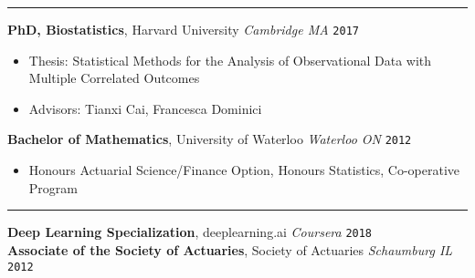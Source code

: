 \documentclass[10pt,english]{report}
\begin{document}
\vspace{5mm}

{\par}
\vspace{1mm}\hrule
\vspace{1mm}

\textbf{PhD, Biostatistics}, Harvard University \hfill \textit{Cambridge MA} \texttt{\quad \phantom{00/0000-00/}2017}
\begin{itemize}
\item Thesis: Statistical Methods for the Analysis of Observational Data with Multiple Correlated Outcomes
\item Advisors: Tianxi Cai, Francesca Dominici
\end{itemize}

\vspace{1mm}

\textbf{Bachelor of Mathematics}, University of Waterloo \hfill \textit{Waterloo ON} \texttt{\quad \phantom{00/0000-00/}2012}
\begin{itemize}
\item Honours Actuarial Science/Finance Option, Honours Statistics, Co-operative
Program
\end{itemize}

\vspace{1mm}
\vspace{1mm}\hrule
\vspace{1mm}

\textbf{Deep Learning Specialization}, deeplearning.ai \hfill \textit{Coursera} \texttt{\quad \phantom{00/0000-00/}2018} \\
\textbf{Associate of the Society of Actuaries}, Society of Actuaries \hfill \textit{Schaumburg IL} \texttt{\quad \phantom{00/0000-00/}2012}
\end{document}
